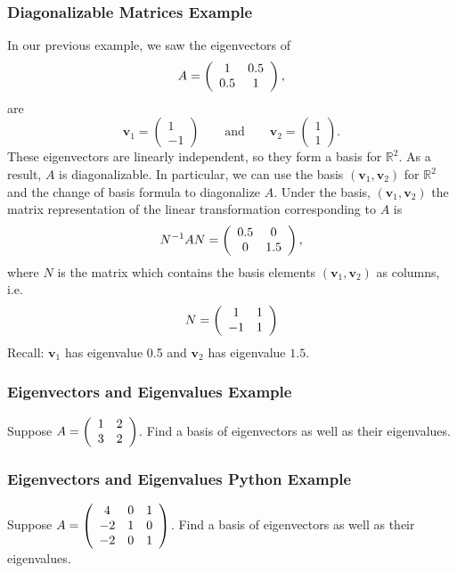 \documentclass{beamer}
\begin{document}
\begin{frame}
\frametitle{Diagonalizable Matrices Example}
{
\tiny
In our previous example, we saw the eigenvectors of 
$$
A = \left(\begin{array}{c c} 1	&	0.5\\	0.5	&	1\end{array}\right),
$$
are
$$
{\boldsymbol v_1} = \left(\begin{array}{c} 1\\	-1\end{array}\right)\qquad\text{and}\qquad {\boldsymbol v_2} = \left(\begin{array}{c} 1\\ 1\end{array}\right).
$$  
These eigenvectors are linearly independent, so they form a basis for $\mathbb{R}^2$. As a result, $A$ is diagonalizable. In particular, we can use the basis $({\boldsymbol v_1}, {\boldsymbol v_2})$ for $\mathbb{R}^2$ and the change of basis formula to diagonalize $A$. Under the basis, $({\boldsymbol v_1}, {\boldsymbol v_2})$ the matrix representation of the linear transformation corresponding to $A$ is
$$
N^{-1}  A N= \left(\begin{array}{c c} 0.5	&	0\\	0	&	1.5\end{array}\right),
$$
where $N$ is the matrix which contains the basis elements $({\boldsymbol v_1}, {\boldsymbol v_2})$ as columns, i.e.
$$
N =  \left(\begin{array}{c c} 1	&	1\\ -1 & 1\end{array}\right) 
$$
Recall: ${\boldsymbol v_1}$ has eigenvalue 0.5 and ${\boldsymbol v_2}$ has eigenvalue $1.5$.
}
\end{frame}



\begin{frame}[t]
\frametitle{Eigenvectors and Eigenvalues Example}
\begin{Example}
Suppose $A = \left(\begin{array}{c c} 1	&	2\\	3	&	2\end{array}\right)$. Find a basis of eigenvectors as well as their eigenvalues.
\end{Example}

\end{frame}


\begin{frame}[fragile]
\frametitle{Eigenvectors and Eigenvalues Python Example}
\begin{Example}
Suppose $A = \left(\begin{array}{c c c} 4	&	0	&	1\\	-2	&1	&	0\\	-2	&	0	& 1\end{array}\right)$. Find a basis of eigenvectors as well as their eigenvalues.
\end{Example}
\end{frame}
\end{document}
